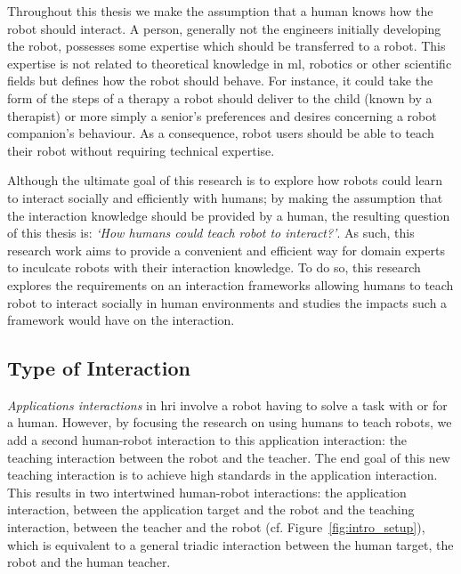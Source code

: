 Throughout this thesis we make the assumption that a human knows how the robot should interact. A person, generally not the engineers initially developing the robot, possesses some expertise which should be transferred to a robot. This expertise is not related to theoretical knowledge in \gls{ml}, robotics or other scientific fields but defines how the robot should behave. For instance,  it could take the form of the steps of a therapy a robot should deliver to the child (known by a therapist) or more simply a senior's preferences and desires concerning a robot companion's behaviour. As a consequence, robot users should be able to teach their robot %
 without requiring technical expertise.

Although the ultimate goal of this research is to explore how robots could learn to interact socially and efficiently with humans; by making the assumption that the interaction knowledge should be provided by a human, the resulting question of this thesis is: \emph{`How humans could teach robot to interact?'}. As such, this research work aims to provide a convenient and efficient way for domain experts to inculcate robots with their interaction knowledge. To do so, this research explores the requirements on an interaction frameworks allowing humans to teach robot to interact socially in human environments and studies the impacts such a framework would have on the interaction.

\subsection{Type of Interaction}
\emph{Applications interactions} in \gls{hri} involve a robot having to solve a task with or for a human. However, by focusing the research on using humans to teach robots, we add a second human-robot interaction to this application interaction: the teaching interaction between the robot and the teacher. The end goal of this new teaching interaction is to achieve high standards in the application interaction. This results in two intertwined human-robot interactions: the application interaction, between the application target and the robot and the teaching interaction, between the teacher and the robot (cf. Figure~\ref{fig:intro_setup}), which is equivalent to a general triadic interaction between the human target, the robot and the human teacher.

